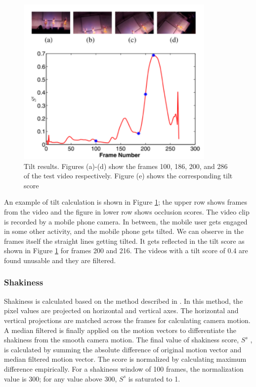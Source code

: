 \documentclass{sig-alternate}
\begin{document}
\begin{figure}
    \centering
    \includegraphics{img4.png}
    \caption{Tilt results. Figures (a)-(d) show the frames 100, 186, 200, and 286 of the test video respectively. Figure (e) shows the corresponding tilt score}
    \label{fig:fig4}
\end{figure}

An example of tilt calculation is shown in Figure \ref{fig:fig4}; the upper row shows frames from the video and the figure in lower row shows occlusion scores. The video clip is recorded by a mobile phone camera. In between, the mobile user gets engaged in some other activity, and the mobile phone gets tilted. We can observe in the frames itself the straight lines getting tilted. It gets reflected in the tilt score as shown in Figure \ref{fig:fig4} for frames 200 and 216. The videos
with a tilt score of 0.4 are found unusable and they are filtered.

\subsubsection{Shakiness}
Shakiness is calculated based on the method described in \cite{4}. In this method, the pixel values are projected on horizontal and vertical axes. The horizontal and vertical projections are matched across the frames for calculating camera motion. A median filtered is finally applied on the motion vectors to differentiate the shakiness from the smooth camera motion. The final value of shakiness score, $S^s$ , is calculated by summing the absolute difference of original motion vector and median filtered motion vector. The score is normalized by calculating maximum difference empirically. For a shakiness window of 100 frames, the normalization value is 300; for any value above 300, $S^s$ is saturated to 1.
\end{document}
